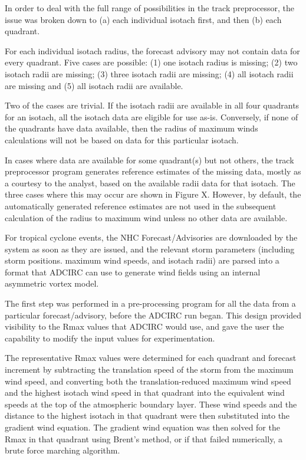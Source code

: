 \documentclass[12pt]{article}
\begin{document}
In order to deal with the full range of possibilities in the track 
preprocessor, the issue was broken down to (a) each individual 
isotach first, and then (b) each quadrant. 

For each individual isotach radius, the forecast advisory may not 
contain data for every quadrant. Five cases are possible: (1) one 
isotach radius is missing; (2) two isotach radii are missing; (3) 
three isotach radii are missing; (4) all isotach radii are missing 
and (5) all isotach radii are available. 

Two of the cases are trivial. If the isotach radii are available in 
all four quadrants for an isotach, all the isotach data are eligible 
for use as-is. Conversely, if none of the quadrants have data 
available, then the radius of maximum winds calculations will not be 
based on data for this particular isotach. 

In cases where data are available for some quadrant(s) but not 
others, the track preprocessor program generates reference estimates 
of the missing data, mostly as a courtesy to the analyst, based on 
the available radii data for that isotach. The three cases where 
this may occur are shown in Figure X. However, by default, the 
automatically generated reference estimates are not used in the 
subsequent calculation of the radius to maximum wind unless no other 
data are available. 

For tropical cyclone events, the NHC Forecast/Advisories are 
downloaded by the system as soon as they are issued, and the 
relevant storm parameters (including storm positions. maximum wind 
speeds, and isotach radii) are parsed into a format that ADCIRC can 
use to generate wind fields using an internal asymmetric vortex 
model. 


The first step was performed in a pre-processing program for all the 
data from a particular forecast/advisory, before the ADCIRC run 
began. This design provided visibility to the Rmax values that 
ADCIRC would use, and gave the user the capability to modify the 
input values for experimentation.

The representative Rmax values were determined for each quadrant and 
forecast increment by subtracting the translation speed of the storm 
from the maximum wind speed, and converting both the 
translation-reduced maximum wind speed and the highest isotach wind 
speed in that quadrant into the equivalent wind speeds at the top of 
the atmospheric boundary layer. These wind speeds and the distance 
to the highest isotach in that quadrant were then substituted into 
the gradient wind equation. The gradient wind equation was then 
solved for the Rmax in that quadrant using Brent's method, or if 
that failed numerically, a brute force marching algorithm.
\end{document}
